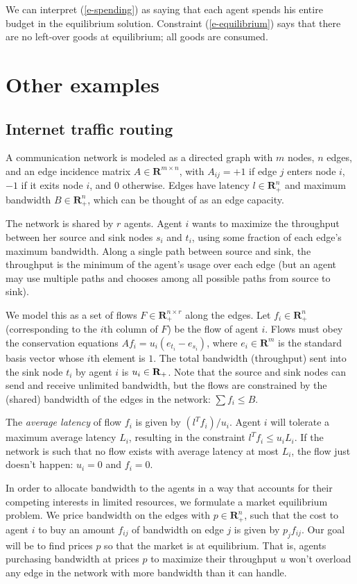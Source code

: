 \documentclass[12pt]{article}
\begin{document}
We can interpret (\ref{e-spending}) as saying that each agent spends his entire
budget in the equilibrium solution. Constraint (\ref{e-equilibrium}) says that
there are no left-over goods at equilibrium; all goods are consumed.

\section{Other examples}

\subsection{Internet traffic routing}

A communication network is modeled as a directed graph with $m$ nodes, $n$
edges, and an edge incidence matrix $A \in \mathbf{R}^{m \times n}$, with
$A_{ij} = +1$ if edge $j$ enters node $i$, $-1$ if it exits node $i$, and 0
otherwise. Edges have latency $l \in \mathbf{R}^n_{+}$ and maximum bandwidth
$B \in \mathbf{R}^n_+$, which can be thought of as an edge capacity.

The network is shared by $r$ agents. Agent $i$ wants to maximize the throughput
between her source and sink nodes $s_i$ and $t_i$, using some fraction
of each edge's maximum bandwidth. Along a single path
between source and sink, the throughput is the minimum of the agent's usage over
each edge (but an agent may use multiple paths and chooses among all possible
paths from source to sink).

We model this as a set of
flows $F \in \mathbf{R}^{n \times r}_+$ along the edges.
Let $f_i \in \mathbf{R}^n_+$ (corresponding to the $i$th column of $F$) be the
flow of agent $i$. Flows must obey the conservation equations
$A f_i = u_i(e_{t_i} - e_{s_i})$, where $e_i \in \mathbf{R}^m$ is the standard
basis vector whose $i$th element is $1$. The total bandwidth (throughput) sent
into the sink node $t_i$ by agent $i$ is $u_i \in {\mbox{\bf R}}_+$.
Note that the source and sink
nodes can send and receive unlimited bandwidth, but the flows are constrained
by the (shared) bandwidth of the edges in the network: $\sum f_i \leq B$.

The \emph{average latency} of flow $f_i$ is given by $(l^T f_i)/u_i$. Agent $i$ will
tolerate a maximum average latency $L_i$, resulting in the constraint
$l^T f_i \leq u_i L_i$.
If the network is such that no flow exists with average latency
at most $L_i$, the flow just doesn't happen: $u_i = 0$ and $f_i = 0$.

In order to allocate bandwidth to the agents in a way that accounts for their
competing interests in limited resources, we formulate a market equilibrium
problem. We price bandwidth on the edges with $p \in \mathbf{R}^n_+$, such that
the cost to agent $i$ to buy an amount $f_{ij}$ of bandwidth on edge $j$ is
given by $p_j f_{ij}$. Our goal will be to find prices $p$ so that the market
is at equilibrium. That is, agents purchasing bandwidth at prices $p$ to
maximize their throughput $u$ won't overload any edge in the network with more
bandwidth than it can handle.
\end{document}
